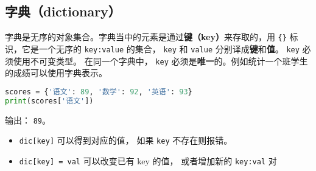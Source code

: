 \subsection{字典（dictionary）}
字典是无序的对象集合。字典当中的元素是通过\textbf{键（key）}来存取的，用 \verb|{}| 标识，它是一个无序的 \verb|key:value| 的集合， \verb|key| 和 \verb|value| 分别译成\textbf{键}和\textbf{值}。 \verb|key| 必须使用不可变类型。 在同一个字典中， \verb|key| 必须是\textbf{唯一}的。例如统计一个班学生的成绩可以使用字典表示。
\begin{lstlisting}[language=python]
scores = {'语文': 89, '数学': 92, '英语': 93}
print(scores['语文'])
\end{lstlisting}
输出： \verb|89|。

\begin{itemize}
\item \verb|dic[key]| 可以得到对应的值， 如果 \verb|key| 不存在则报错。
\item \verb|dic[key] = val| 可以改变已有 key 的值， 或者增加新的 \verb|key:val| 对
\end{itemize}
